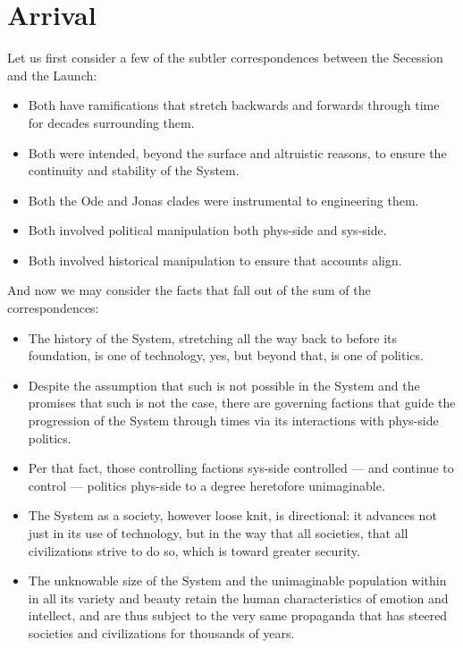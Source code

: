 \documentclass[10pt]{memoir}
\begin{document}
	\cleartoverso
  \part{Arrival}
  Let us first consider a few of the subtler correspondences between the Secession and the Launch:
  
  \begin{itemize}
  \item Both have ramifications that stretch backwards and forwards through time for decades surrounding them.
  \item Both were intended, beyond the surface and altruistic reasons, to ensure the continuity and stability of the System.
  \item Both the Ode and Jonas clades were instrumental to engineering them.
  \item Both involved political manipulation both phys-side and sys-side.
  \item Both involved historical manipulation to ensure that accounts align.
  \end{itemize}
 
  And now we may consider the facts that fall out of the sum of the correspondences:
 
  \begin{itemize}
  \item The history of the System, stretching all the way back to before its foundation, is one of technology, yes, but beyond that, is one of politics.
  \item Despite the assumption that such is not possible in the System and the promises that such is not the case, there are governing factions that guide the progression of the System through times via its interactions with phys-side politics.
  \item Per that fact, those controlling factions sys-side controlled --- and continue to control --- politics phys-side to a degree heretofore unimaginable.
  \item The System as a society, however loose knit, is directional: it advances not just in its use of technology, but in the way that all societies, that all civilizations strive to do so, which is toward greater security.
  \item The unknowable size of the System and the unimaginable population within in all its variety and beauty retain the human characteristics of emotion and intellect, and are thus subject to the very same propaganda that has steered societies and civilizations for thousands of years.
  \end{itemize}
\end{document}
